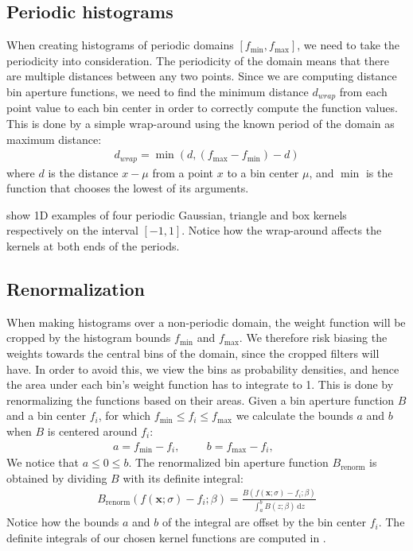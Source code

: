 \documentclass[thesis.tex]{subfiles}
\def\x{\mathbf{x}}
\begin{document}
\subsection{Periodic histograms}
When creating histograms of periodic domains $[f_\text{min}, f_\text{max}]$, we need to take the periodicity into consideration.
The periodicity of the domain means that there are multiple distances between any two points. Since we are computing distance bin aperture functions, we need to find the minimum distance $d_{wrap}$ from each point value to each bin center in order to correctly compute the function values. This is done by a simple wrap-around using the known period of the domain as maximum distance:
\begin{align*}
	d_{wrap} = \min(d,(f_\text{max} - f_\text{min})-d)
\end{align*}
where $d$ is the distance $x - \mu$ from a point $x$ to a bin center $\mu$, and $\min$ is the function that chooses the lowest of its arguments.

  show 1D examples of four periodic Gaussian, triangle and box kernels respectively on the interval $[-1,1]$. Notice how the wrap-around affects the kernels at both ends of the periods.

\subsection{Renormalization}
When making histograms over a non-periodic domain, the weight function will be cropped by the histogram bounds $f_\text{min}$ and $f_\text{max}$. We therefore risk biasing the weights towards the central bins of the domain, since the cropped filters will have. In order to avoid this, we view the bins as probability densities, and hence the area under each bin's weight function has to integrate to 1. This is done by renormalizing the functions based on their areas. Given a bin aperture function $B$ and a bin center $f_i$, for which $f_\text{min} \leq f_i \leq f_\text{max}$ we calculate the bounds $a$ and $b$ when $B$ is centered around $f_i$:
\begin{align*}
	a = f_\text{min} - f_i,\hspace{1cm}
	b = f_\text{max} - f_i,\hspace{1cm}
\end{align*}
We notice that $a \leq 0 \leq b$. The renormalized bin aperture function $B_\text{renorm}$ is obtained by dividing $B$ with its definite integral:
\begin{align*}
	B_\text{renorm}\left( f(\x;\sigma)-f_i;\beta \right) = \frac{B \left(f(\x;\sigma)-f_i;\beta \right)}{\int_a^b B \left( z;\beta \right)\,\text{d}z}
\end{align*}
Notice how the bounds $a$ and $b$ of the integral are offset by the bin center $f_i$. The definite integrals of our chosen kernel functions are computed in .
\end{document}
